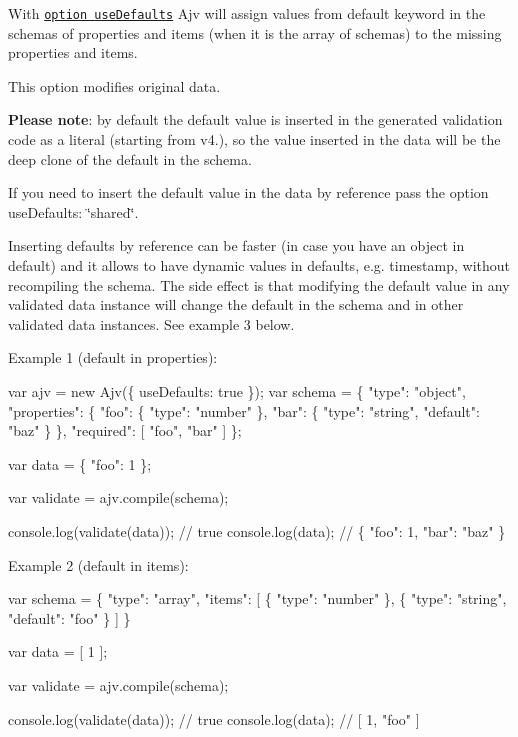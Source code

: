 With \href{#options}{\tt option {\ttfamily use\+Defaults}} Ajv will assign values from {\ttfamily default} keyword in the schemas of {\ttfamily properties} and {\ttfamily items} (when it is the array of schemas) to the missing properties and items.

This option modifies original data.

{\bfseries Please note}\+: by default the default value is inserted in the generated validation code as a literal (starting from v4.), so the value inserted in the data will be the deep clone of the default in the schema.

If you need to insert the default value in the data by reference pass the option {\ttfamily use\+Defaults\+: \char`\"{}shared\char`\"{}}.

Inserting defaults by reference can be faster (in case you have an object in {\ttfamily default}) and it allows to have dynamic values in defaults, e.\+g. timestamp, without recompiling the schema. The side effect is that modifying the default value in any validated data instance will change the default in the schema and in other validated data instances. See example 3 below.

Example 1 ({\ttfamily default} in {\ttfamily properties})\+:


\begin{DoxyCode}
var ajv = new Ajv(\{ useDefaults: true \});
var schema = \{
  "type": "object",
  "properties": \{
    "foo": \{ "type": "number" \},
    "bar": \{ "type": "string", "default": "baz" \}
  \},
  "required": [ "foo", "bar" ]
\};

var data = \{ "foo": 1 \};

var validate = ajv.compile(schema);

console.log(validate(data)); // true
console.log(data); // \{ "foo": 1, "bar": "baz" \}
\end{DoxyCode}


Example 2 ({\ttfamily default} in {\ttfamily items})\+:


\begin{DoxyCode}
var schema = \{
  "type": "array",
  "items": [
    \{ "type": "number" \},
    \{ "type": "string", "default": "foo" \}
  ]
\}

var data = [ 1 ];

var validate = ajv.compile(schema);

console.log(validate(data)); // true
console.log(data); // [ 1, "foo" ]
\end{DoxyCode}


